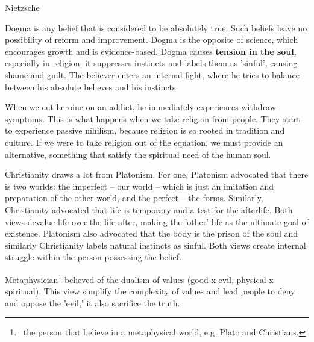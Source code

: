 \documentclass[12pt, a4paper]{article}
\begin{document}

\titlehead{Beyond Good and Evil}{Nietzsche}



Dogma is any belief that is considered to be absolutely true.
Such beliefs leave no possibility of reform and improvement. Dogma
is the opposite of science, which encourages growth and
is evidence-based. Dogma causes \textbf{tension in the soul}, especially
in religion; it suppresses instincts and labels them as 'sinful',
causing shame and guilt. The believer enters an internal fight,
where he tries to balance between his absolute believes and 
his instincts. 


When we cut heroine on an addict, he immediately experiences 
withdraw symptoms. This is what happens when we take religion
from people. They start to experience passive nihilism, because
religion is so rooted in tradition and culture. If we were to 
take religion out of the equation, we must provide an alternative,
something that satisfy the spiritual need of the human soul.


Christianity draws a lot from Platonism. For one, Platonism advocated that there is 
two worlds: the imperfect -- our world -- which is just an imitation and preparation of the other world,
and the perfect -- the forms. Similarly, Christianity advocated that
life is temporary and a test for the afterlife. Both views devalue life over the life
after, making the 'other' life as the ultimate goal of existence. Platonism also advocated 
that the body is the prison of the soul and similarly Christianity labels natural instincts 
as sinful. Both views create internal struggle within the person possessing the belief.


Metaphysician\footnote{\, the person that believe in a metaphysical world, e.g. Plato and Christians.}
believed of the dualism of values (good x evil, physical x spiritual). This view simplify the
complexity of values and lead people to deny and oppose the 'evil,' it also sacrifice the truth.
\end{document}
